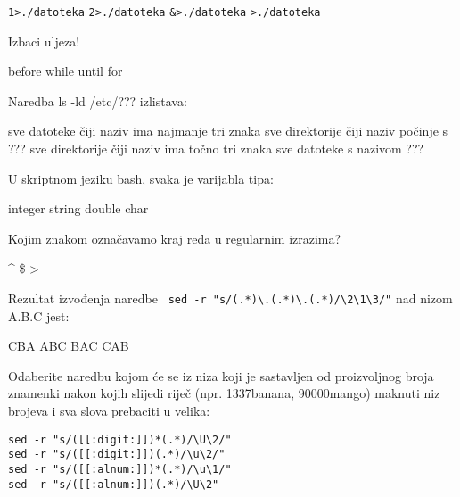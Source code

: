 \documentclass[a4paper,11pt]{exam}
\newcommand{\shell}[1]{\texttt{#1}}
\begin{document}
\begin{questions}
	\begin{oneparchoices}
	  \choice \shell{1>./datoteka} 
		\CorrectChoice \shell{2>./datoteka} 
		\choice \shell{\&>./datoteka} 
		\choice \shell{>./datoteka}
	\end{oneparchoices}
	
	\question
	Izbaci uljeza!
	
	\begin{oneparchoices}
		\CorrectChoice before
		\choice while
		\choice until
		\choice for
	\end{oneparchoices}

	\question
	Naredba ls -ld /etc/??? izlistava:
	\begin{oneparchoices}
		\choice sve datoteke čiji naziv ima najmanje tri znaka
		\choice sve direktorije čiji naziv počinje s ???
    \CorrectChoice sve direktorije čiji naziv ima točno tri znaka
	  \choice sve datoteke s nazivom ???
	\end{oneparchoices}
	
	\question
  U skriptnom jeziku bash, svaka je varijabla tipa:
	
	\begin{oneparchoices}
		\choice integer
		\CorrectChoice string
		\choice double
		\choice char
	\end{oneparchoices}
	
	\question
  Kojim znakom označavamo kraj reda u regularnim izrazima?

	\begin{oneparchoices}
		\choice \textasciicircum
		\CorrectChoice \$
		\choice >
		\choice *
	\end{oneparchoices}

	\question
	Rezultat izvođenja naredbe \verb| sed -r "s/(.*)\.(.*)\.(.*)/\2\1\3/"| nad nizom A.B.C jest:
	
	\begin{oneparchoices}
		\choice CBA
		\choice ABC
		\CorrectChoice BAC
		\choice CAB
	\end{oneparchoices}
	
	\question
	Odaberite naredbu kojom će se iz niza koji je sastavljen od proizvoljnog broja znamenki nakon kojih slijedi riječ (npr. 1337banana, 90000mango) maknuti niz brojeva i sva slova prebaciti u velika:

	\begin{oneparchoices}
		\CorrectChoice \verb|sed -r "s/([[:digit:]])*(.*)/\U\2/"| \\ 
		\choice \verb|sed -r "s/([[:digit:]])(.*)/\u\2/"|  \\
		\choice \verb|sed -r "s/([[:alnum:]])*(.*)/\u\1/"| \\
		\choice \verb|sed -r "s/([[:alnum:]])(.*)/\U\2"| 
	\end{oneparchoices}



\end{questions}
\end{document}
